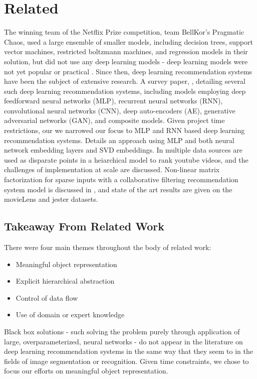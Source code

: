 \section{Related}
The winning team of the Netflix Prize competition, team BellKor's Pragmatic Chaos, used a large ensemble of smaller models, including decision trees, support vector machines, restricted boltzmann machines, and regression models in their solution, but did not use any deep learning models - deep learning models were not yet popular or practical \cite{Piotte 09th Pragmatic}\cite{bigChaos}\cite{Koren091the}. Since then, deep learning recommendation systems have been the subject of extensive research. A survey paper, \cite{DBLP:journals/corr/ZhangYS17aa}, detailing several such deep learning recommendation systems, including models employing deep feedforward neural networks (MLP), recurrent neural networks (RNN), convolutional neural networks (CNN), deep auto-encoders (AE), generative adversarial networks (GAN), and composite models. Given project time restrictions, our we narrowed our focus to MLP and RNN based deep learning recommendation systems.\cite{He2017} Details an approach using MLP and both neural network embedding layers and SVD embeddings. In \cite{45530} multiple data sources are used as disparate points in a heiarchical model to rank youtube videos, and the challenges of implementation at scale are discussed. Non-linear matrix factorization for sparse inputs with a collaborative filtering recommendation system model is discussed in \cite{strub:hal-01256422}, and state of the art results are given on the movieLens and jester datasets. 
\subsection{Takeaway From Related Work}
There were four main themes throughout the body of related work:
\begin{itemize}
\item Meaningful object representation
\item Explicit hierarchical abstraction
\item Control of data flow
\item Use of domain or expert knowledge
\end{itemize}
Black box solutions - such solving the problem purely through application of large, overparameterized, neural networks - do not appear in the literature on deep learning recommendation systems in the same way that they seem to in the fields of image segmentation or recognition. Given time constraints, we chose to focus our efforts on meaningful object representation.  